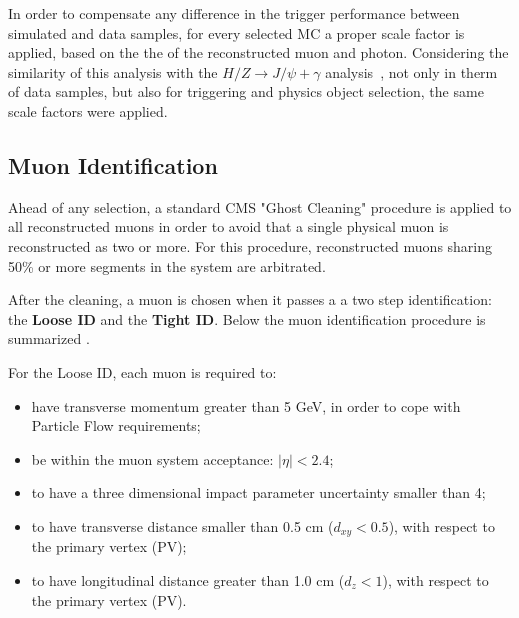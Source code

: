 In order to compensate any difference in the trigger performance between simulated and data samples, for every selected MC a proper scale factor is applied, based on the the \PT of the reconstructed muon and photon. Considering the similarity of this analysis with the $H/Z \rightarrow J/\psi + \gamma$ analysis~\cite{papper_jpsi}, not only in therm of data samples, but also for triggering and physics object selection, the same scale factors were applied.

\subsection{Muon Identification}
\label{sec:muon_id}

Ahead of any selection, a standard CMS "Ghost Cleaning" procedure is applied to all reconstructed muons in order to avoid that a single physical muon is reconstructed as two or more. For this procedure, reconstructed muons sharing 50\% or more segments in the system are arbitrated.

After the cleaning, a muon is chosen when it passes a a two step identification: the \textbf{Loose ID} and the \textbf{Tight ID}. Below the muon identification procedure is summarized .


For the Loose ID, each muon is required to:
\begin{itemize}
  \item have transverse momentum greater than 5 GeV, in order to cope with Particle Flow requirements;
  \item be within the muon system acceptance: $|\eta| < 2.4$;
  \item to have a three dimensional impact parameter uncertainty smaller than 4;
  \item to have transverse distance smaller than 0.5 cm ($d_{xy} < 0.5$), with respect to the primary vertex (PV);
  \item to have longitudinal distance greater than 1.0 cm ($d_{z} < 1$), with respect to the primary vertex (PV).

\end{itemize}

